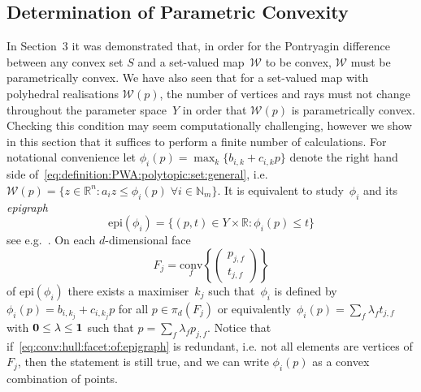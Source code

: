 \documentclass[smallextended]{svjour3}       %
\numberwithin{equation}{section}
\providecommand{\conv}{\text{conv}}
\providecommand{\epi}{\text{epi}}
\begin{document}
\subsection{Determination of Parametric Convexity}
%
In Section~3 it was demonstrated that, in order for the
Pontryagin difference between any convex set $S$ and a set-valued
map~$\mathcal W$ to be convex, $\mathcal W$ must be parametrically
convex.
%
We have also seen that for a set-valued map with polyhedral realisations $\mathcal W(p)$, the number of vertices and rays must not change throughout the parameter space~$Y$ in order that $\mathcal W(p)$ is parametrically convex.
%
Checking this condition may seem computationally challenging, however
we show in this section that it suffices to perform a finite number of calculations.
%
For notational convenience let $\phi_i(p) = \max_k\{b_{i,k}+c_{i,k}p\}$ denote the right hand side of~\eqref{eq:definition:PWA:polytopic:set:general}, i.e. $\mathcal W(p) = \{z\in\mathbb R^n: a_i z\leq \phi_i(p)\;\forall i\in\mathbb N_m\}$.
%
It is equivalent to study~$\phi_i$ and its \emph{epigraph} 
%
$$
	\epi(\phi_i) = \{(p,t)\in Y\times\mathbb R: \phi_i(p)\leq t\}
$$
%
see e.g.~\cite{Gorokhovik:1993}.
%
On each $d$-dimensional face 
%
\begin{equation}\label{eq:conv:hull:facet:of:epigraph}
F_j = \underset{f}{\conv}\left\{\left(\begin{array}{c}p_{j,f}\\ t_{j,f}\end{array}\right)\right\}
\end{equation}
%
of $\epi(\phi_i)$ there exists a maximiser~$k_j$ such that~$\phi_i$ is defined by~$\phi_i(p)=b_{i,k_j}+c_{i,k_j}p$ for all $p\in\pi_d(F_j)$ or equivalently~$\phi_i(p)=\sum_{f}\lambda_f t_{j,f}$ with ${\bf{0}}\leq\lambda\leq{\bf{1}}$ such that $p=\sum_{f}\lambda_f p_{j,f}$.
%
Notice that if~\eqref{eq:conv:hull:facet:of:epigraph} is redundant, i.e. not all elements are vertices of $F_j$, then the statement is still true, and we can write $\phi_i(p)$ as a convex combination of points.
\end{document}
